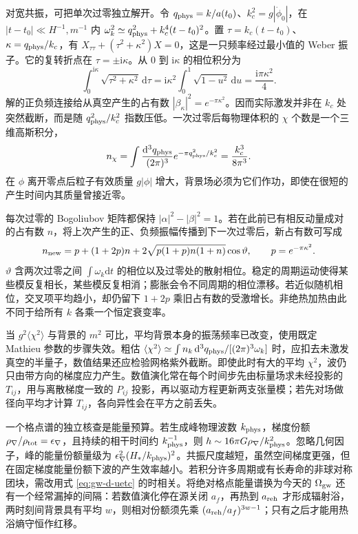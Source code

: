 对宽共振，可把单次过零独立解开。令 $q_{\rm phys}=k/a(t_0)$、$k_c^2=g|\dot\phi_0|$，在 $|t-t_0|\ll H^{-1},m^{-1}$ 内 $\omega_k^2\simeq q_{\rm phys}^2+k_c^4(t-t_0)^2$。置 $\tau=k_c(t-t_0)$、$\kappa=q_{\rm phys}/k_c$，有 $X_{\tau\tau}+(\tau^2+\kappa^2)X=0$，这是一只频率经过最小值的 Weber 振子。它的复转折点在 $\tau=\pm\mathrm i\kappa$。从 $0$ 到 $\mathrm i\kappa$ 的相位积分为
\[
 \int_0^{\mathrm i\kappa}\sqrt{\tau^2+\kappa^2}\,\mathrm d\tau
 =\mathrm i\kappa^2\int_0^1\sqrt{1-u^2}\,\mathrm du
 =\frac{\mathrm i\pi\kappa^2}{4}.
\]
解的正负频连接给从真空产生的占有数 $|\beta_\kappa|^2=e^{-\pi\kappa^2}$。因而实际激发并非在 $k_c$ 处突然截断，而是随 $q_{\rm phys}^2/k_c^2$ 指数压低。一次过零后每物理体积的 $\chi$ 个数是一个三维高斯积分，
\[
 n_\chi=\int\frac{\mathrm d^3q_{\rm phys}}{(2\pi)^3}
           e^{-\pi q_{\rm phys}^2/k_c^2}=\frac{k_c^3}{8\pi^3}.
\]
在 $\phi$ 离开零点后粒子有效质量 $g|\phi|$ 增大，背景场必须为它们作功，即使在很短的产生时间内其质量曾接近零。

每次过零的 Bogoliubov 矩阵都保持 $|\alpha|^2-|\beta|^2=1$。若在此前已有相反动量成对的占有数 $n$，将上次产生的正、负频振幅传播到下一次过零后，新占有数可写成
\[
 n_{\rm new}=p+(1+2p)n
 +2\sqrt{p(1+p)n(1+n)}\cos\vartheta,\qquad p=e^{-\pi\kappa^2}.
\]
$\vartheta$ 含两次过零之间 $\int\omega_k\mathrm dt$ 的相位以及过零处的散射相位。稳定的周期运动使得某些模反复相长，某些模反复相消；膨胀会令不同周期的相位漂移。若近似随机相位，交叉项平均趋小，却仍留下 $1+2p$ 乘旧占有数的受激增长。非绝热加热由此不同于给所有 $k$ 各乘一个恒定衰变率。

当 $g^2\langle\chi^2\rangle$ 与背景的 $m^2$ 可比，平均背景本身的振荡频率已改变，使用既定 Mathieu 参数的步骤失效。粗估 $\langle\chi^2\rangle\simeq\int n_k\,\mathrm d^3q_{\rm phys}/[(2\pi)^3\omega_k]$ 时，应扣去未激发真空的半量子，数值结果还应检验网格紫外截断。即使此时有大的平均 $\chi^2$，波仍只由带方向的梯度应力产生。数值演化常在每个时间步先由标量场求未经投影的 $T_{ij}$，用与离散梯度一致的 $P_{ij}$ 投影，再以驱动方程更新两支张量模；若先对场做径向平均才计算 $T_{ij}$，各向异性会在平方之前丢失。

一个格点谱的独立核查是能量预算。若生成峰物理波数 $k_{\rm phys}$，梯度份额 $\rho_\nabla/\rho_{\rm tot}=\epsilon_\nabla$，且持续的相干时间约 $k_{\rm phys}^{-1}$，则 $h\sim16\pi G\rho_\nabla/k_{\rm phys}^2$。忽略几何因子，峰的能量份额量级为 $\epsilon_\nabla^2(H_*/k_{\rm phys})^2$。共振尺度越短，虽然空间梯度更强，但在固定梯度能量份额下波的产生效率越小。若积分许多周期或有长寿命的非球对称团块，需改用式 \eqref{eq:gw-d-uetc} 的时相关。将绝对格点能量谱换为今天的 $\Omega_{\rm gw}$ 还有一个经常漏掉的间隔：若数值演化停在源关闭 $a_f$，再热到 $a_{\rm reh}$ 才形成辐射浴，两时刻间背景具有平均 $w$，则相对份额须先乘 $(a_{\rm reh}/a_f)^{3w-1}$；只有之后才能用热浴熵守恒作红移。

